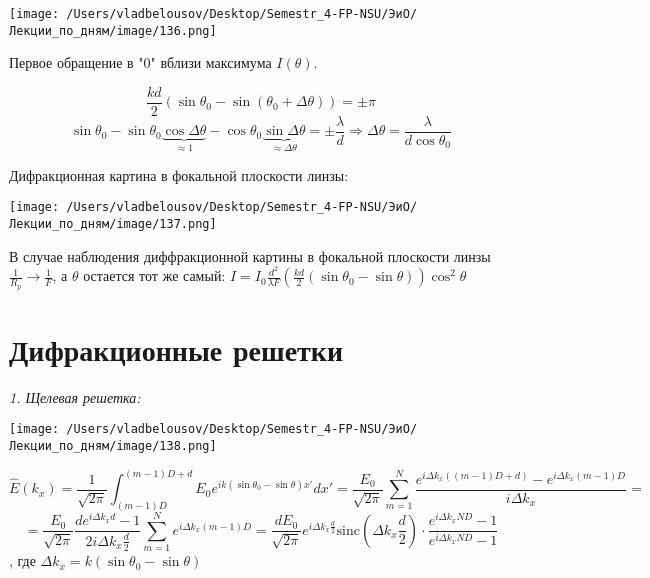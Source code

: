\documentclass[12pt, a4paper]{report}
\begin{document}
\begin{center}
    \texttt{[image: /Users/vladbelousov/Desktop/Semestr\_4-FP-NSU/ЭиО/Лекции\_по\_дням/image/136.png]}
\end{center}

Первое обращение в "0" вблизи максимума  \( I(\theta) \). 

\[ \frac{kd }{2 } (\sin \theta_0 - \sin (\theta_0 + \Delta \theta)) = \pm  \pi  \] 
\[ \sin \theta_0 - \sin \theta_0 \underbrace{\cos \Delta \theta}_{\approx 1} - \cos  \theta_0 \underbrace{\sin  \Delta \theta}_{ \approx \Delta \theta} = \pm  \frac{\lambda}{d} \Rightarrow \Delta \theta = \frac{\lambda}{ d \cos \theta_0}   \] 

Дифракционная картина в фокальной плоскости линзы: 

\begin{center}
    \texttt{[image: /Users/vladbelousov/Desktop/Semestr\_4-FP-NSU/ЭиО/Лекции\_по\_дням/image/137.png]}
\end{center}

В случае наблюдения диффракционной картины в фокальной плоскости линзы \( \displaystyle  \frac{1}{R_p } \to  \frac{1}{F }   \), а \( \theta  \) остается тот же самый: \(\displaystyle  I = I_0 \frac{d ^2 }{\lambda F }\left( \frac{kd}{2 } (\sin \theta_0 - \sin \theta) \right) \cos  ^2 \theta   \) 

\section{Дифракционные решетки}

\textit{1. Щелевая решетка: } 

\begin{center}
    \texttt{[image: /Users/vladbelousov/Desktop/Semestr\_4-FP-NSU/ЭиО/Лекции\_по\_дням/image/138.png]}
\end{center} 

\[ \hat{ E } (k_x ) = \frac{1}{\sqrt{2 \pi }} \int_{(m -1 )D}^{(m-1)D +d} E_0 e^{ i k (\sin  \theta_0 - \sin  \theta) x' } dx' = \frac{E_0}{\sqrt{2 \pi}} \sum_{m =1}^{N }  \frac{e^{i \Delta k_x ((m -1 )D + d)} - e^{i \Delta k_x (m -1 )D } }{i \Delta k_x } =     \] 
\[ =\frac{E_0}{\sqrt{2 \pi }} \frac{d e ^{i \Delta k_x d } -1 }{ 2 i \Delta k_x \frac{d}{2 }  } \sum_{m =1}^{N }  e^{ i \Delta k_x (m-1 )D } = \frac{d E_0}{\sqrt{2 \pi }}  e^{ i \Delta k_x \frac{d}{2} } \mathrm{sinc } \left( \Delta k_x \frac{d}{2}  \right)   \cdot\frac{e^{ i \Delta k_x N D} -1 }{e^{ i \Delta k_x N D  } -1 }   \] 
, где \( \Delta k_x  = k (\sin \theta_0 - \sin \theta) \) 
\end{document}
